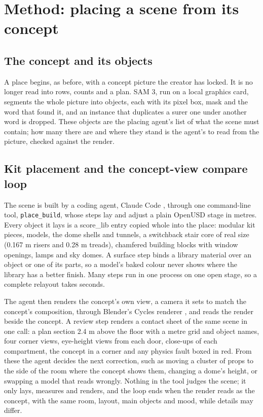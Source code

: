 \section{Method: placing a scene from its concept}\label{method-placing-a-scene-from-its-concept}

\subsection{The concept and its objects}\label{the-concept-and-its-objects}

A place begins, as before, with a concept picture the creator has locked. It is no longer read into rows, counts and a plan. SAM 3, run on a local graphics card, segments the whole picture into objects, each with its pixel box, mask and the word that found it, and an instance that duplicates a surer one under another word is dropped. These objects are the placing agent's list of what the scene must contain; how many there are and where they stand is the agent's to read from the picture, checked against the render.

\subsection{Kit placement and the concept-view compare loop}\label{kit-placement-and-the-concept-view-compare-loop}

The scene is built by a coding agent, Claude Code \citep{claudecode}, through one command-line tool, \texttt{place\_build}, whose steps lay and adjust a plain OpenUSD stage in metres. Every object it lays is a score\_lib entry copied whole into the place: modular kit pieces, models, the dome shells and tunnels, a switchback stair core of real size (0.167 m risers and 0.28 m treads), chamfered building blocks with window openings, lamps and sky domes. A surface step binds a library material over an object or one of its parts, so a model's baked colour never shows where the library has a better finish. Many steps run in one process on one open stage, so a complete relayout takes seconds.

The agent then renders the concept's own view, a camera it sets to match the concept's composition, through Blender's Cycles renderer \citep{blender}, and reads the render beside the concept. A review step renders a contact sheet of the same scene in one call: a plan section 2.4 m above the floor with a metre grid and object names, four corner views, eye-height views from each door, close-ups of each compartment, the concept in a corner and any physics fault boxed in red. From these the agent decides the next correction, such as moving a cluster of props to the side of the room where the concept shows them, changing a dome's height, or swapping a model that reads wrongly. Nothing in the tool judges the scene; it only lays, measures and renders, and the loop ends when the render reads as the concept, with the same room, layout, main objects and mood, while details may differ.

